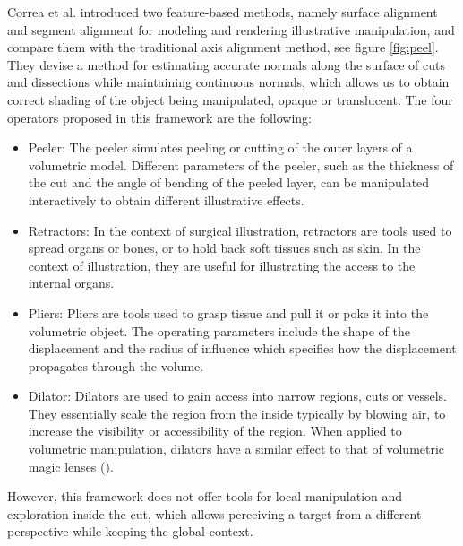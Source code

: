  Correa et al. introduced two feature-based methods, namely surface alignment and segment alignment for modeling and rendering illustrative manipulation, and compare them with the traditional axis alignment method, see figure \ref{fig:peel}. They devise a method for estimating accurate normals along the surface of cuts
and dissections while maintaining continuous normals, which allows
us to obtain correct shading of the object being manipulated, opaque
or translucent. The four operators proposed in this framework are the following:
\begin{itemize}
\item Peeler: The peeler simulates peeling or cutting of the outer layers
of a volumetric model. Different parameters
of the peeler, such as the thickness of the cut and the angle of bending of
the peeled layer, can be manipulated interactively to obtain different
illustrative effects.
\item Retractors: In the context of surgical illustration, retractors are tools used to spread organs or bones, or to hold back soft tissues such as
skin. In the context of illustration, they are useful for illustrating the
access to the internal organs.
\item Pliers: Pliers are tools used to grasp tissue and pull it or poke it into the volumetric object. The operating parameters include the shape of
the displacement and the radius of influence which specifies how the
displacement propagates through the volume.
\item Dilator: Dilators are used to gain access into narrow regions, cuts
or vessels. They essentially scale the region from the inside typically
by blowing air, to increase the visibility or accessibility of the region.
When applied to volumetric manipulation, dilators have a similar effect
to that of volumetric magic lenses (\cite{1532818}).
\end{itemize} 
However, this framework does not offer tools for local manipulation and exploration inside the cut, which allows perceiving a target from a different perspective while keeping the global context. 


